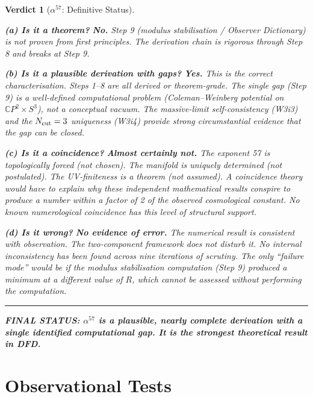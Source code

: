\documentclass[11pt,a4paper]{article}
\newcommand{\CP}{\mathbb{C}P}
\newtheorem{verdict}{Verdict}
\begin{document}
\begin{verdict}[$\alpha^{57}$: Definitive Status]
\label{verd:final}
~

\textbf{(a) Is it a theorem?} \textbf{No.} Step 9 (modulus
stabilisation / Observer Dictionary) is not proven from first
principles. The derivation chain is rigorous through Step 8 and breaks
at Step 9.

\textbf{(b) Is it a plausible derivation with gaps?} \textbf{Yes.}
This is the correct characterisation. Steps 1--8 are all derived or
theorem-grade. The single gap (Step 9) is a well-defined computational
problem (Coleman--Weinberg potential on $\CP^2 \times S^3$), not a
conceptual vacuum. The massive-limit self-consistency (W3i3) and the
$N_{\rm cut} = 3$ uniqueness (W3i4) provide strong circumstantial
evidence that the gap can be closed.

\textbf{(c) Is it a coincidence?} \textbf{Almost certainly not.} The
exponent 57 is topologically forced (not chosen). The manifold is
uniquely determined (not postulated). The UV-finiteness is a theorem
(not assumed). A coincidence theory would have to explain why these
independent mathematical results conspire to produce a number within
a factor of 2 of the observed cosmological constant. No known
numerological coincidence has this level of structural support.

\textbf{(d) Is it wrong?} \textbf{No evidence of error.} The numerical
result is consistent with observation. The two-component framework does
not disturb it. No internal inconsistency has been found across nine
iterations of scrutiny. The only ``failure mode'' would be if the
modulus stabilisation computation (Step 9) produced a minimum at a
different value of $R$, which cannot be assessed without performing the
computation.

\medskip
\noindent\rule{\textwidth}{0.5pt}
\medskip

\textbf{FINAL STATUS: $\alpha^{57}$ is a plausible, nearly complete
derivation with a single identified computational gap. It is the
strongest theoretical result in DFD.}
\end{verdict}

\section{Observational Tests}
\label{sec:tests}
\end{document}
